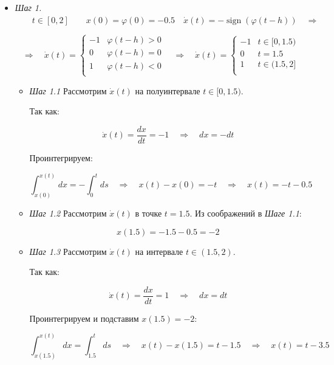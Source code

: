 \documentclass[a4paper,12pt]{article}
\begin{document}
	\begin{itemize}
		
		\item \textit{Шаг 1.} \(\qquad t \in [0, 2] \qquad x(0) = \varphi(0) = -0.5 \quad \dot{x}(t) = -\operatorname{sign}(\varphi(t - h)) \quad \Longrightarrow\)

		
		\[
		\Longrightarrow \quad 
		\dot{x}(t) = 
		\begin{cases}
		-1 & \varphi(t - h) > 0	\\
		0 & \varphi(t - h) = 0 \\
		1 & \varphi(t - h) < 0 \\
		\end{cases}
		\quad \Longrightarrow \quad 
		\dot{x}(t) = 
		\begin{cases}
			-1 &  t \in [0, 1.5)	\\
			0 & t = 1.5 \\
			1 & t \in (1.5, 2] \\
		\end{cases}
		\]
	
		\begin{itemize}
			\item \textit{Шаг 1.1} Рассмотрим \(\dot{x}(t)\) на полуинтервале \(t \in [0, 1.5) \).
			
			Так как:
			
			\[\dot{x}(t) = \frac{dx}{dt} = -1 \quad \Longrightarrow \quad dx = -dt\]

			Проинтегрируем:
			
			\[ \int_{x(0)}^{x(t)}dx = -\int_{0}^{t}ds \quad \Longrightarrow \quad x(t) - x(0) = -t \quad \Longrightarrow \quad x(t) = -t -0.5\]	
			
			\item \textit{Шаг 1.2} Рассмотрим \(\dot{x}(t)\) в точке  \(t = 1.5 \). Из соображений в \textit{Шаге 1.1}:
			
			\[x(1.5) = -1.5 - 0.5 = -2\]
			
			\item \textit{Шаг 1.3} Рассмотрим \(\dot{x}(t)\) на интервале \(t \in (1.5, 2) \).
			
			Так как:
			
			\[\dot{x}(t) = \frac{dx}{dt} = 1 \quad \Longrightarrow \quad dx = dt\]
			
			Проинтегрируем и подставим \(x(1.5) = -2\):
			
			\[ \int_{x(1.5)}^{x(t)}dx = \int_{1.5}^{t}ds \quad \Longrightarrow \quad x(t) - x(1.5) = t - 1.5 \quad \Longrightarrow \quad x(t) = t - 3.5\]	


\end{itemize}
\end{itemize}
\end{document}
